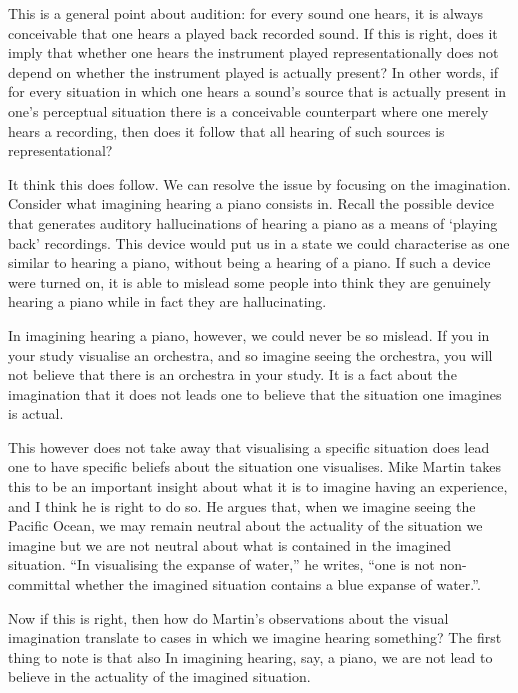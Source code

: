 \documentclass[sloppy, journal, git, bytitle, dodraft]{humapap}
\begin{document}
This is a general point about audition: for every sound one hears, it is always conceivable that one hears a played back recorded sound. If this is right, does it imply that whether one hears the instrument played representationally does not depend on whether the instrument played is actually present? In other words, if for every situation in which one hears a sound's source that is actually present in one's perceptual situation there is a conceivable counterpart where one merely hears a recording, then does it follow that all hearing of such sources is representational? 

It think this does follow. We can resolve the issue by focusing on the imagination. Consider what imagining hearing a piano consists in. Recall the possible device that generates auditory hallucinations of hearing a piano as a means of `playing back' recordings. This device would put us in a state we could characterise as one similar to hearing a piano, without being a hearing of a piano. If such a device were turned on, it is able to mislead some people into think they are genuinely hearing a piano while in fact they are hallucinating. 

In imagining hearing a piano, however, we could never be so mislead. If you in your study visualise an orchestra, and so imagine seeing the orchestra, you will not believe that there is an orchestra in your study. It is a fact about the imagination that it does not leads one to believe that the situation one imagines is actual. 

This however does not take away that visualising a specific situation does lead one to have specific beliefs about the situation one visualises. Mike Martin takes this to be an important insight about what it is to imagine having an experience, and I think he is right to do so. He argues that, when we imagine seeing the Pacific Ocean, we may remain neutral about the actuality of the situation we imagine but we are not neutral about what is contained in the imagined situation. ``In visualising the expanse of water,'' he writes, ``one is not non-committal whether the imagined situation contains a blue expanse of water.''\autocite[p. 414]{martin2002aa}. 

Now if this is right, then how do Martin's observations about the visual imagination translate to cases in which we imagine hearing something? The first thing to note is that also In imagining hearing, say, a piano, we are not lead to believe in the actuality of the imagined situation. 
\end{document}
